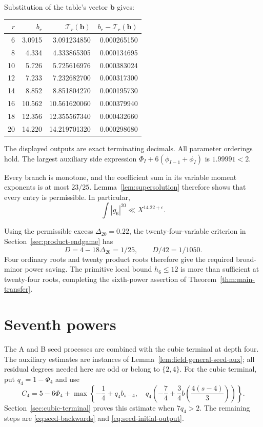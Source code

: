 \documentclass[11pt]{amsart}
\theoremstyle{definition}
\numberwithin{equation}{section}
\begin{document}
Substitution of the table's vector $\boldsymbol b$ gives:
\begin{center}
\begin{tabular}{@{}r r r r@{}}
\hline
$r$ & $b_r$ & $\mathcal T_r(\boldsymbol b)$ & $b_r-\mathcal T_r(\boldsymbol b)$\\
\hline
6 &3.0915&3.091234850&0.000265150\\
8 &4.334&4.333865305&0.000134695\\
10&5.726&5.725616976&0.000383024\\
12&7.233&7.232682700&0.000317300\\
14&8.852&8.851804270&0.000195730\\
16&10.562&10.561620060&0.000379940\\
18&12.356&12.355567340&0.000432660\\
20&14.220&14.219701320&0.000298680\\
\hline
\end{tabular}
\end{center}
The displayed outputs are exact terminating decimals. All parameter orderings
hold. The largest auxiliary side expression
$\Phi_I+6(\phi_{I-1}+\phi_I)$ is $1.99991<2$.

Every branch is monotone, and the coefficient sum in its variable
moment exponents is at most $23/25$. Lemma~\ref{lem:supersolution}
therefore shows that every entry is permissible. In particular,
\[
 \int|g_6|^{20}\ll X^{14.22+\epsilon}.
\]

Using the permissible excess $\Delta_{20}=0.22$, the twenty-four-variable
criterion in Section~\ref{sec:product-endgame} has
\[
 D=4-18\Delta_{20}=1/25,\qquad D/42=1/1050.
\]
Four ordinary roots and twenty product roots therefore give the required
broad-minor power saving. The primitive local bound $h_6\le12$ is more than
sufficient at twenty-four roots, completing the sixth-power assertion of
Theorem~\ref{thm:main-transfer}.

\section{Seventh powers}
\label{sec:seventh-powers}
The A and B seed processes are combined with the cubic terminal at
depth four. The auxiliary estimates are instances of
Lemma~\ref{lem:field-general-seed-aux}; all residual degrees needed
here are odd or belong to $\{2,4\}$.
For the cubic terminal, put $q_4=1-\Phi_4$ and use
\begin{equation}\label{eq:septic-cubic-terminal}
 C_4=5-6\Phi_4+
 \max\left\{-\frac14+q_4b_{s-4},\quad
 q_4\left(-\frac74+\frac34b\left(\frac{4(s-4)}3\right)\right)\right\}.
\end{equation}
Section~\ref{sec:cubic-terminal} proves this estimate when $7q_4>2$.
The remaining steps are \eqref{eq:seed-backwards} and
\eqref{eq:seed-initial-output}.
\end{document}
